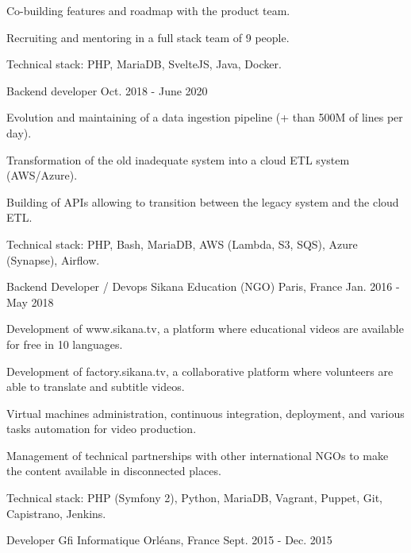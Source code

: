 \begin{cventries}
{\begin{cvitems}
        \item {Co-building features and roadmap with the product team.}
        \item {Recruiting and mentoring in a full stack team of 9 people.}
        \item {Technical stack: PHP, MariaDB, SvelteJS, Java, Docker.}
      \end{cvitems}
      \vspace{-2.0mm}
    }
  \cventry
    {Backend developer}
    {}
    {}
    {Oct. 2018 - June 2020}
    {
      \begin{cvitems}
        \item {Evolution and maintaining of a data ingestion pipeline (+ than 500M of lines per day).}
        \item {Transformation of the old inadequate system into a cloud ETL system (AWS/Azure).}
        \item {Building of APIs allowing to transition between the legacy system and the cloud ETL.}
        \item {Technical stack: PHP, Bash, MariaDB, AWS (Lambda, S3, SQS), Azure (Synapse), Airflow.}
      \end{cvitems}
    }
  \cventry
    {Backend Developer / Devops}
    {Sikana Education (NGO)}
    {Paris, France}
    {Jan. 2016 - May 2018}
    {
      \begin{cvitems}
        \item {Development of www.sikana.tv, a platform where educational videos are available for free in 10 languages.}
        \item {Development of factory.sikana.tv, a collaborative platform where volunteers are able to translate and subtitle videos.}
        \item {Virtual machines administration, continuous integration, deployment, and various tasks automation for video production.}
        \item {Management of technical partnerships with other international NGOs to make the content available in disconnected places.}
        \item {Technical stack: PHP (Symfony 2), Python, MariaDB, Vagrant, Puppet, Git, Capistrano, Jenkins.}
      \end{cvitems}
    }
  \cventry
    {Developer}
    {Gfi Informatique}
    {Orléans, France}
    {Sept. 2015 - Dec. 2015}
    {
      \begin{cvitems}

\end{cvitems}}
\end{cventries}
